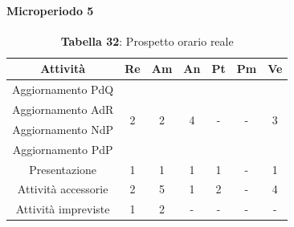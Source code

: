 \paragraph{Microperiodo 5}
\begin{table}[H]
	\centering
	\begin{tabular}{|c|c|c|c|c|c|c|}
		\hline
		\rowcolor{lighter-grayer}
		\textbf{Attività}   & \textbf{Re}        & \textbf{Am}        & \textbf{An}        & \textbf{Pt}        & \textbf{Pm}        & \textbf{Ve}        \\ \hline
		Aggiornamento PdQ   & \multirow{4}{*}{2} & \multirow{4}{*}{2} & \multirow{4}{*}{4} & \multirow{4}{*}{-} & \multirow{4}{*}{-} & \multirow{4}{*}{3} \\ \cline{1-1}
		Aggiornamento AdR   &                    &                    &                    &                    &                    &                    \\ \cline{1-1}
		Aggiornamento NdP   &                    &                    &                    &                    &                    &                    \\ \cline{1-1}
		Aggiornamento PdP   &                    &                    &                    &                    &                    &                    \\ \hline
		Presentazione       & 1                  & 1                  & 1                  & 1                  & -                  & 1                  \\ \hline
		Attività accessorie & 2                  & 5                  & 1                  & 2                  & -                  & 4                  \\ \hline
		Attività impreviste & 1                  & 2                  & -                  & -                  & -                  & -                  \\ \hline
	\end{tabular}
\caption*{\textbf{Tabella 32}: Prospetto orario reale\\}
\end{table}

